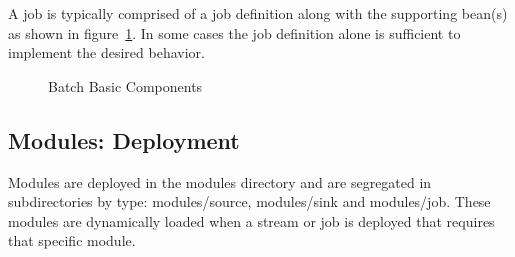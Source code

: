 \par

A job is typically comprised of a job definition along with the supporting
bean(s) as shown in figure~\ref{fig:batchmbc}.
In some cases the job definition alone is sufficient to implement the desired behavior.

\par

\begin{figure}
\centering
{}
\caption{Batch Basic Components}
\label{fig:batchmbc}
\end{figure}

\subsection{Modules: Deployment}
Modules are deployed in the modules directory and are segregated in
subdirectories by type: modules/source, modules/sink and modules/job.
These modules are dynamically loaded when a stream or job is deployed that requires that
specific module.

\par
